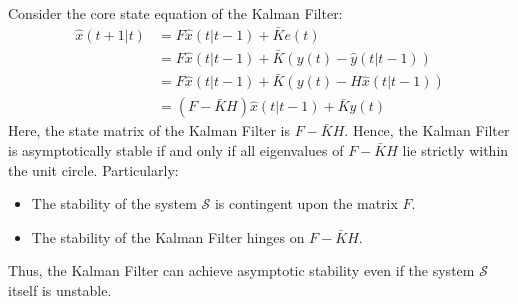 Consider the core state equation of the Kalman Filter:
\begin{align*}
    \hat{x}(t+1|t)  &=F\hat{x}(t|t-1)+\bar{K}e(t) \\
                    &=F\hat{x}(t|t-1)+\bar{K}\left(y(t)-\hat{y}(t|t-1)\right) \\
                    &=F\hat{x}(t|t-1)+\bar{K}\left(y(t)-H\hat{x}(t|t-1)\right) \\
                    &=\left(F-\bar{K}H\right)\hat{x}(t|t-1)+\bar{K}y(t)
\end{align*}
Here, the state matrix of the Kalman Filter is $F-\bar{K}H$. 
Hence, the Kalman Filter is asymptotically stable if and only if all eigenvalues of $F-\bar{K}H$ lie strictly within the unit circle. 
Particularly:
\begin{itemize}
    \item The stability of the system $\mathcal{S}$ is contingent upon the matrix $F$.
    \item The stability of the Kalman Filter hinges on $F-\bar{K}H$.
\end{itemize}
Thus, the Kalman Filter can achieve asymptotic stability even if the system $\mathcal{S}$ itself is unstable.